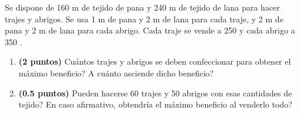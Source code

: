 
Se dispone de 160 m de tejido de pana y 240 m de tejido de lana para hacer trajes y abrigos. Se usa 1 m de pana y 2 m de lana para cada traje, y 2 m de pana y 2 m de lana para cada abrigo. Cada traje se vende a 250 \texteuro{} y cada abrigo a 350 \texteuro{}.
\begin{enumerate}[label=\alph*)]
\item \textbf{(2 puntos)} \textquestiondown{}Cuántos trajes y abrigos se deben confeccionar para obtener el máximo beneficio? \textquestiondown{}A cuánto asciende dicho beneficio?
\item \textbf{(0.5 puntos)} \textquestiondown{}Pueden hacerse 60 trajes y 50 abrigos con esas cantidades de tejido? En caso afirmativo, \textquestiondown{}obtendría el máximo beneficio al venderlo todo?
\end{enumerate}
